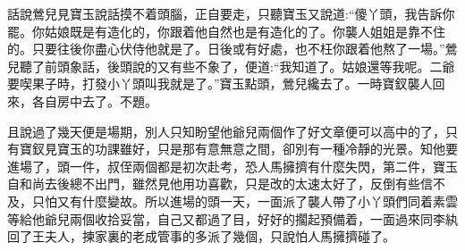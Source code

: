 


\begin{parag}
    話說鶯兒見寶玉說話摸不着頭腦，正自要走，只聽寶玉又說道:“傻丫頭，我告訴你罷。你姑娘既是有造化的，你跟着他自然也是有造化的了。你襲人姐姐是靠不住的。只要往後你盡心伏侍他就是了。日後或有好處，也不枉你跟着他熬了一場。”鶯兒聽了前頭象話，後頭說的又有些不象了，便道:“我知道了。姑娘還等我呢。二爺要喫果子時，打發小丫頭叫我就是了。”寶玉點頭，鶯兒纔去了。一時寶釵襲人回來，各自房中去了。不題。
\end{parag}


\begin{parag}
    且說過了幾天便是場期，別人只知盼望他爺兒兩個作了好文章便可以高中的了，只有寶釵見寶玉的功課雖好，只是那有意無意之間，卻別有一種冷靜的光景。知他要進場了，頭一件，叔侄兩個都是初次赴考，恐人馬擁擠有什麼失閃，第二件，寶玉自和尚去後總不出門，雖然見他用功喜歡，只是改的太速太好了，反倒有些信不及，只怕又有什麼變故。所以進場的頭一天，一面派了襲人帶了小丫頭們同着素雲等給他爺兒兩個收拾妥當，自己又都過了目，好好的擱起預備着，一面過來同李紈回了王夫人，揀家裏的老成管事的多派了幾個，只說怕人馬擁擠碰了。
\end{parag}


